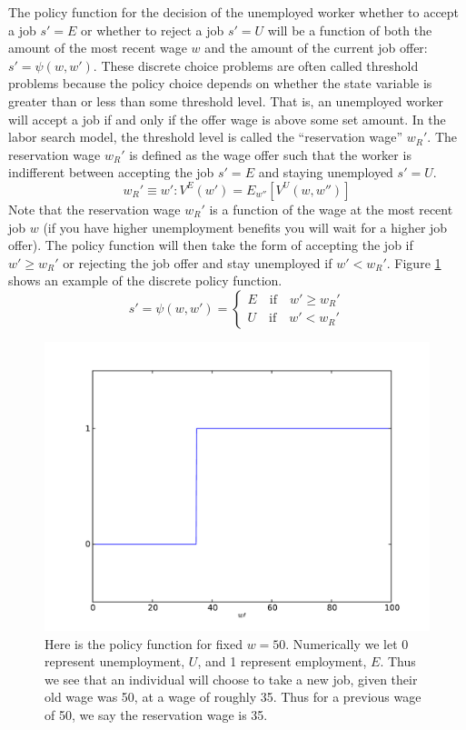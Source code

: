 The policy function for the decision of the unemployed worker whether to accept a job $s'=E$ or whether to reject a job $s'=U$ will be a function of both the amount of the most recent wage $w$ and the amount of the current job offer: $s' = \psi(w,w')$. These discrete choice problems are often called threshold problems because the policy choice depends on whether the state variable is greater than or less than some threshold level. That is, an unemployed worker will accept a job if and only if the offer wage is above some set amount. In the labor search model, the threshold level is called the ``reservation wage'' $w_R'$. The reservation wage $w_R'$ is defined as the wage offer such that the worker is indifferent between accepting the job $s' = E$ and staying unemployed $s' = U$.
\begin{equation}\label{EqWR}
   w_R' \equiv w': V^E(w') = E_{w''}\left[V^U(w,w'')\right]
\end{equation}
Note that the reservation wage $w_R'$ is a function of the wage at the most recent job $w$ (if you have higher unemployment benefits you will wait for a higher job offer). The policy function will then take the form of accepting the job if $w' \geq w_R'$ or rejecting the job offer and stay unemployed if $w' < w_R'$.  Figure \ref{fig:disc_policy} shows an example of the discrete policy function.
\begin{equation}\label{EqSprime}
   s' = \psi(w,w') = \begin{cases}
                      E \quad\text{if}\quad w' \geq w_R' \\
                      U \quad\text{if}\quad w' < w_R'
                   \end{cases}
\end{equation}

\begin{figure}
\includegraphics[width=\textwidth]{disc_policy.pdf}
\caption{Here is the policy function for fixed $w = 50$.  Numerically we let 0 represent unemployment, $U$, and 1 represent employment, $E$.  Thus we see that an individual will choose to take a new job, given their old wage was 50, at a wage of roughly 35.  Thus for a previous wage of 50, we say the reservation wage is 35.}
\label{fig:disc_policy}
\end{figure}

